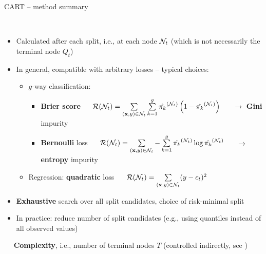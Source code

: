 \begin{frame}{CART -- method summary}

\footnotesize

 \\

\begin{itemize}
  \item Calculated after each split, i.e., at each node $\mathcal{N}_t$ (which is not necessarily the terminal node $Q_t$)
  \item In general, compatible with arbitrary losses -- typical choices:
  \begin{itemize}
    \footnotesize
    \item $g$-way classification:
    \begin{itemize}
      \footnotesize
      \item \textbf{Brier score} ~~
      $\mathcal{R}(\mathcal{N}_t) = \sum\limits_{(\mathbf{x},y) \in \mathcal{N}_t} \sum\limits_{k=1}^g
      \hat{\pi_{k}}^{(\mathcal{N}_t)} \left(1 - \hat{\pi_{k}}^{(\mathcal{N}_t)} \right)$
      ~~ $\rightarrow$ \textbf{Gini} impurity
      \item \textbf{Bernoulli} loss ~~
      $\mathcal{R}(\mathcal{N}_t) = \sum\limits_{(\mathbf{x},y) \in \mathcal{N}_t} - \sum\limits_{k=1}^g
      \hat{\pi_{k}}^{(\mathcal{N}_t)} \log \hat{\pi_{k}}^{(\mathcal{N}_t)}$
      ~~ $\rightarrow$ \textbf{entropy} impurity
    \end{itemize}
    \item Regression: \textbf{quadratic} loss ~~
    $\mathcal{R}(\mathcal{N}_t) = \sum\limits_{(\mathbf{x},y) \in \mathcal{N}_t} (y - c_t)^2$
  \end{itemize}
\end{itemize}

\medskip


\begin{itemize}
  \item \textbf{Exhaustive} search over all split candidates, choice of 
  risk-minimal split
  \item In practice: reduce number of split candidates (e.g., using quantiles instead of all observed values)
\end{itemize}

\medskip

 ~~ \textbf{Complexity}, i.e., 
number of terminal nodes $T$ (controlled indirectly, see ) 

\end{frame}

